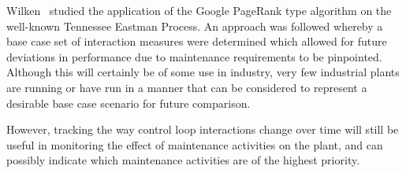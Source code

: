 Wilken~\cite{Wilken2012} studied the application of the Google PageRank type algorithm on the well-known Tennessee Eastman Process.
An approach was followed whereby a base case set of interaction measures were determined which allowed for future deviations in performance due to maintenance requirements to be pinpointed.
Although this will certainly be of some use in industry, very few industrial plants are running or have run in a manner that can be considered to represent a desirable base case scenario for future comparison.

However, tracking the way control loop interactions change over time will still be useful in monitoring the effect of maintenance activities on the plant, and can possibly indicate which maintenance activities are of the highest priority.

%
%

%
%

%
%
